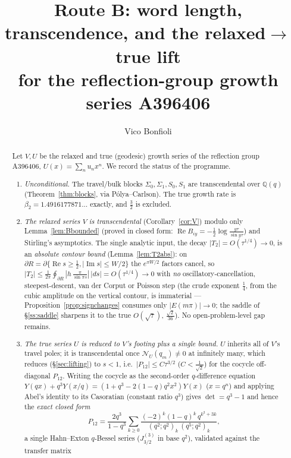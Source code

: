 \documentclass[11pt]{article}
\title{Route B: word length, transcendence, and the relaxed$\to$true lift\\
\large for the reflection-group growth series A396406}
\author{Vico Bonfioli}
\date{}
\begin{document}
\maketitle

\begin{abstract}
\noindent Let $V,U$ be the relaxed and true (geodesic) growth series of the reflection group A396406,
$U(x)=\sum_n u_nx^n$. We record the status of the programme.
\begin{enumerate}[leftmargin=1.6em,itemsep=0.15em]
\item[\textup{(1)}] \emph{Unconditional.} The travel/bulk blocks $\Sigma_0,\Sigma_1,S_0,S_1$ are transcendental
over $\mathbb Q(q)$ (Theorem~\ref{thm:blocks}, via P\'olya--Carlson). The true growth rate is
$\beta_2=1.4916177871\ldots$ exactly, and $\tfrac32$ is excluded.
\item[\textup{(2)}] \emph{The relaxed series $V$ is transcendental} (Corollary~\ref{cor:V}) modulo only
Lemma~\ref{lem:Bbounded} \textup(proved in closed form: $\operatorname{Re}B_{iy}=-\tfrac12\log\tfrac{y\tau}{\sin y\tau}$\textup)
and Stirling's asymptotics. The single analytic input, the decay $|T_2|=O(\tau^{1/4})\to0$, is an
\emph{absolute contour bound} (Lemma~\ref{lem:T2abs}): on
$\partial R=\partial\{\operatorname{Re}s\ge\tfrac12,|\operatorname{Im}s|\le W/2\}$ the $e^{\pi W/2}$ factors
cancel, so $|T_2|\le\tfrac1{2\pi}\oint_{\partial R}|h\,\tfrac{\pi}{\sin\pi s}|\,|ds|=O(\tau^{1/4})\to0$ with
\emph{no} oscillatory-cancellation, steepest-descent, van der Corput or Poisson step (the crude exponent
$\tfrac14$, from the cubic amplitude on the vertical contour, is immaterial --- Proposition~\ref{prop:signchanges}
consumes only $|E(m\pi)|\to0$; the saddle of \S\ref{ss:saddle} sharpens it to the true $O(\sqrt\tau)$,
$\tfrac{\sqrt2}{36}$). No open-problem-level gap remains.
\item[\textup{(3)}] \emph{The true series $U$ is reduced to $V$'s footing plus a single bound.} $U$ inherits
all of $V$'s travel poles; it is transcendental once $\mathcal N_U(q_m)\ne0$ at infinitely many, which reduces
(\S\ref{sec:lifting}) to $s<1$, i.e.\ $|P_{12}|\le C\tau^{3/2}$ ($C<\tfrac1{\sqrt2}$) for the cocycle
off-diagonal $P_{12}$. Writing the cocycle as the second-order $q$-difference equation
$Y(qx)+q^3Y(x/q)=(1+q^3-2(1-q)q^2x^2)Y(x)$ ($x=q^n$) and applying Abel's identity to its Casoratian
(constant ratio $q^3$) gives $\det=q^3-1$ and hence the \emph{exact closed form}
\[
  P_{12}=\frac{2q^3}{1-q^3}\sum_{k\ge0}\frac{(-2)^k(1-q)^k\,q^{k^2+3k}}{(q^2;q^2)_k\,(q^5;q^2)_k},
\]
a single Hahn--Exton $q$-Bessel series ($J^{(3)}_{3/2}$ in base $q^2$), validated against the transfer matrix

\end{enumerate}
\end{abstract}
\end{document}
